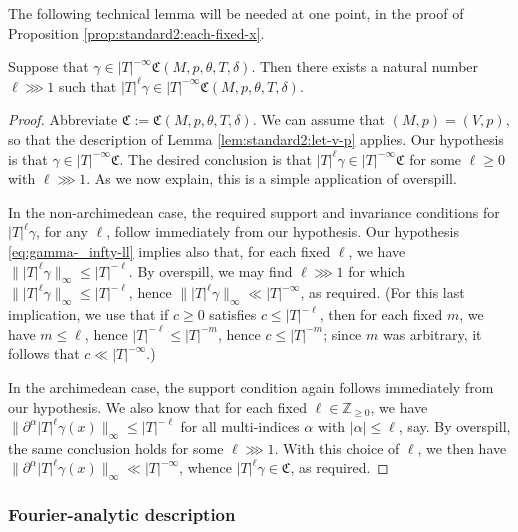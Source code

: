 The following technical lemma will be needed at one point, in the proof of Proposition \ref{prop:standard2:each-fixed-x}.
\begin{lemma}\label{lem:standard2:overspill-frak-C-M}
  Suppose that $\gamma \in |T|^{-\infty} \mathfrak{C}(M,p,\theta,T,\delta)$.  Then there exists a natural number $\ell \ggg 1$ such that $|T|^{\ell} \gamma \in |T|^{-\infty} \mathfrak{C}(M,p,\theta,T,\delta)$.
\end{lemma}
\begin{proof}
  Abbreviate $\mathfrak{C} := \mathfrak{C}(M,p,\theta,T,\delta)$.  We can assume that $(M,p) = (V,p)$, so that the description of Lemma \ref{lem:standard2:let-v-p} applies.  Our hypothesis is that $\gamma \in |T|^{-\infty} \mathfrak{C}$.  The desired conclusion is that $|T|^{\ell} \gamma \in |T|^{-\infty} \mathfrak{C}$ for some $\ell \geq 0$ with $\ell \ggg 1$.  As we now explain, this is a simple application of overspill.

  In the non-archimedean case, the required support and invariance conditions for $|T|^{\ell} \gamma$, for any $\ell$, follow immediately from our hypothesis.  Our hypothesis \eqref{eq:gamma-_infty-ll} implies also that, for each fixed $\ell$, we have $\||T|^{\ell} \gamma \|_{\infty} \leq |T|^{-\ell}$.  By overspill, we may find $\ell \ggg 1$ for which $\||T|^{\ell} \gamma \|_{\infty} \leq |T|^{-\ell}$, hence $\||T|^{\ell} \gamma \|_{\infty} \ll |T|^{-\infty}$, as required.  (For this last implication, we use that if $c \geq 0$ satisfies $c \leq \lvert T \rvert^{- \ell}$, then for each fixed $m$, we have $m \leq \ell$, hence $\lvert T \rvert^{- \ell} \leq \lvert T \rvert^{- m}$, hence $c \leq \lvert T \rvert^{- m}$; since $m$ was arbitrary, it follows that $c \ll \lvert T \rvert^{- \infty}$.)

  In the archimedean case, the support condition again follows immediately from our hypothesis.  We also know that for each fixed $\ell \in \mathbb{Z}_{\geq 0}$, we have $\|\partial^\alpha |T|^{\ell} \gamma(x)\|_{\infty} \leq |T|^{-\ell}$ for all multi-indices $\alpha$ with $|\alpha| \leq \ell$, say.  By overspill, the same conclusion holds for some $\ell \ggg 1$.  With this choice of $\ell$, we then have $\|\partial^\alpha |T|^{\ell} \gamma (x)\|_{\infty} \ll |T|^{-\infty}$, whence $|T|^{\ell} \gamma \in \mathfrak{C}$, as required.
\end{proof}



\subsubsection{Fourier-analytic description}

